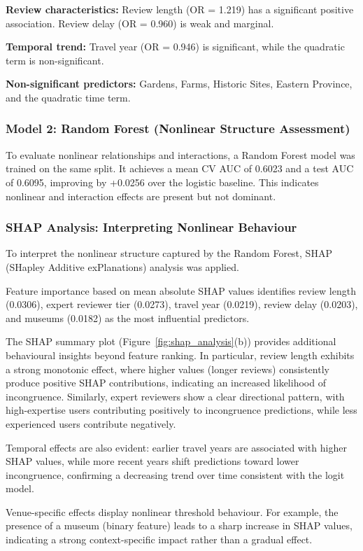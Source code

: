 \documentclass[conference]{IEEEtran}
\begin{document}
\textbf{Review characteristics:} Review length (OR = 1.219) has a significant positive association. Review delay (OR = 0.960) is weak and marginal.

\textbf{Temporal trend:} Travel year (OR = 0.946) is significant, while the quadratic term is non-significant.

\textbf{Non-significant predictors:} Gardens, Farms, Historic Sites, Eastern Province, and the quadratic time term.

\subsubsection{Model 2: Random Forest (Nonlinear Structure Assessment)}
To evaluate nonlinear relationships and interactions, a Random Forest model was trained on the same split. It achieves a mean CV AUC of 0.6023 and a test AUC of 0.6095, improving by +0.0256 over the logistic baseline. This indicates nonlinear and interaction effects are present but not dominant.

\subsubsection{SHAP Analysis: Interpreting Nonlinear Behaviour}
To interpret the nonlinear structure captured by the Random Forest, SHAP (SHapley Additive exPlanations) analysis was applied.

Feature importance based on mean absolute SHAP values identifies review length (0.0306), expert reviewer tier (0.0273), travel year (0.0219), review delay (0.0203), and museums (0.0182) as the most influential predictors.

The SHAP summary plot (Figure~\ref{fig:shap_analysis}(b)) provides additional behavioural insights beyond feature ranking. In particular, review length exhibits a strong monotonic effect, where higher values (longer reviews) consistently produce positive SHAP contributions, indicating an increased likelihood of incongruence. Similarly, expert reviewers show a clear directional pattern, with high-expertise users contributing positively to incongruence predictions, while less experienced users contribute negatively.

Temporal effects are also evident: earlier travel years are associated with higher SHAP values, while more recent years shift predictions toward lower incongruence, confirming a decreasing trend over time consistent with the logit model.

Venue-specific effects display nonlinear threshold behaviour. For example, the presence of a museum (binary feature) leads to a sharp increase in SHAP values, indicating a strong context-specific impact rather than a gradual effect.
\end{document}
